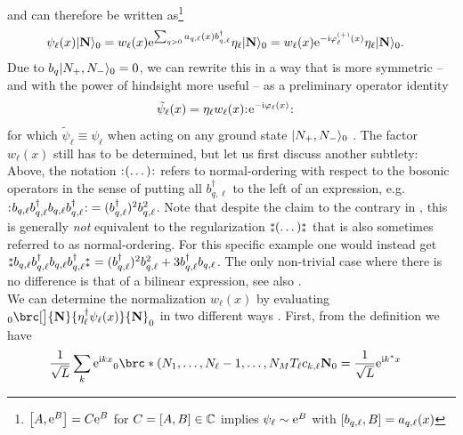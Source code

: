 and can therefore be written as\footnote{$\klb*{A, \powe{B}} = C \powe{B}$ for $C=\klb*{A,B}\in\mathbb{C}$ implies $\psi_\ell \sim \powe{B}$ with $\klb*{b_{q,\ell}, B} = a_{q,\ell}(x)$}
\begin{align*}
\psi_\ell(x) \Ket{\textbf{N}}_0 &= w_\ell(x) \powe{\sum_{q> 0} a_{q,\ell}(x) b_{q,\ell}^\dagger} \eta_\ell \Ket{\textbf{N}}_0 = w_\ell(x) \powe{-\i \varphi_\ell\eplus(x)} \eta_\ell \Ket{\textbf{N}}_0.
\end{align*}
Due to $b_q\Ket{N_+,N_-}_0=0$, we can rewrite this in a way that is more symmetric -- and with the power of hindsight more useful -- as a preliminary operator identity
\begin{align*}
\tilde{\psi}_\ell(x) &= \eta_\ell w_\ell(x) \normord{\powe{-\i\varphi_\ell(x)}}
\end{align*}
for which $\tilde{\psi}_\ell \equiv \psi_\ell$ when acting on any ground state $\Ket{N_+,N_-}_0$ \cite[]{Bosonization_DelftSchoeller_1998}.
The factor $w_\ell(x)$ still has to be determined, but let us first discuss another subtlety:
Above, the notation $\normord{(\dots)}$ refers to normal-ordering with respect to the bosonic operators in the sense of putting all $b_{q,\ell}^\dagger$ to the left of an expression, e.g. $\normord{b_{q,\ell} b_{q,\ell}^\dagger b_{q,\ell} b_{q,\ell}^\dagger} = \kla{b_{q,\ell}^\dagger}^2 b_{q,\ell}^2$.
Note that despite the claim to the contrary in \cite[]{Bosonization_DelftSchoeller_1998}, this is generally \emph{not} equivalent to the regularization $\varnormord{(\dots)}$ that is also sometimes referred to as normal-ordering.
For this specific example one would instead get $\varnormord{b_{q,\ell} b_{q,\ell}^\dagger b_{q,\ell} b_{q,\ell}^\dagger} = \kla{b_{q,\ell}^\dagger}^2 b_{q,\ell}^2 + 3b_{q,\ell}^\dagger b_{q,\ell}$.
The only non-trivial case where there is no difference is that of a bilinear expression, see also \cite[]{Cardy_1996}.\\
We can determine the normalization $w_\ell(x)$ by evaluating ${}_0\brc[\big]{\textbf{N}}{\eta_\ell^\dagger \psi_\ell(x)}{\textbf{N}}_0$ in two different ways \cite[]{Bosonization_DelftSchoeller_1998}.
First, from the definition we have
\begin{align*}
\frac{1}{\sqrt{L}} \sum_k \powe{\i kx} {}_0\brc*{(N_1,\dots,N_\ell-1,\dots,N_M}{T_\ell c_{k,\ell}}{\textbf{N}}_0 &= \frac{1}{\sqrt{L}} \powe{\i k^\ast x}
\end{align*}
